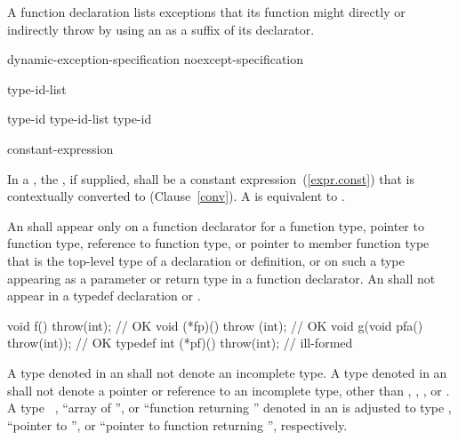 \pnum
A function declaration lists exceptions
that its function might directly or indirectly throw
by using an
as a suffix of its declarator.

\begin{bnf}
\br
    dynamic-exception-specification\br
    noexcept-specification
\end{bnf}

\begin{bnf}
\br
     type-id-list\opt \terminal{)}
\end{bnf}

\begin{bnf}
\br
    type-id \opt\br
    type-id-list \terminal{,} type-id \opt
\end{bnf}

\begin{bnf}
\br
     \terminal{(} constant-expression \terminal{)}\br
\end{bnf}

%
In a , the ,
if supplied, shall be a constant expression~(\ref{expr.const}) that is contextually
converted to  (Clause~\ref{conv}). A 
 is equivalent to .

\pnum
An
shall appear only on a function declarator for a function type,
pointer to function type, reference to function type, or pointer to
member function type that is the top-level type of a declaration or
definition, or on such a type appearing as a parameter or return type
in a function declarator.
An
shall not appear in a typedef declaration or .
\enterexample
\begin{codeblock}
void f() throw(int);                    // OK
void (*fp)() throw (int);               // OK
void g(void pfa() throw(int));          // OK
typedef int (*pf)() throw(int);         // ill-formed
\end{codeblock}

\exitexample
{}%
A type denoted in an
shall not denote an incomplete type.
A type denoted in an
shall not denote a pointer or reference to an incomplete type, other than
,
,
,
or
.
A type \cv\ , ``array of '', or ``function returning ''
denoted in an  is adjusted to type ,
``pointer to '', or ``pointer to function returning '', respectively.

